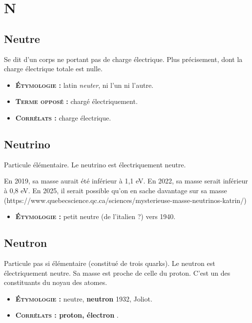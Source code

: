 \chapter{N}
\section{Neutre}
Se dit d'un corps ne portant pas de charge électrique. Plus précisement, dont la charge électrique totale est nulle.
{\footnotesize
\begin{itemize}[leftmargin=1cm, label=, itemsep=1pt]
\item {\bf \textsc{Étymologie} :} latin {\it neuter}, ni l'un ni l'autre.
\item {\bf \textsc{Terme opposé} :} chargé électriquement.
\item {\bf \textsc{Corrélats} :} charge électrique.
\end{itemize}
}
\section{Neutrino}
Particule élémentaire.
Le neutrino est électriquement neutre.

En 2019, sa masse aurait été inférieur à 1,1 eV.
En 2022, sa masse serait inférieur à 0,8 eV.
En 2025, il serait possible qu'on en sache davantage sur sa masse
{\footnotesize
(https://www.quebecscience.qc.ca/sciences/mysterieuse-masse-neutrinos-katrin/)
}

{\footnotesize
\begin{itemize}[leftmargin=1cm, label=, itemsep=1pt]
\item {\bf \textsc{Étymologie} :} petit neutre (de l'italien ?) vers 1940.
\end{itemize}
}
\section{Neutron}
Particule pas si élémentaire (constitué de trois quarks).
Le neutron est électriquement neutre.
Sa masse est proche de celle du proton.
C'est un des constituants du noyau des atomes.
{\footnotesize
\begin{itemize}[leftmargin=1cm, label=, itemsep=1pt]
\item {\bf \textsc{Étymologie} :} neutre, {\bf neutron} 1932, Joliot.
\item {\bf \textsc{Corrélats} : proton, électron} .
\end{itemize}
}
